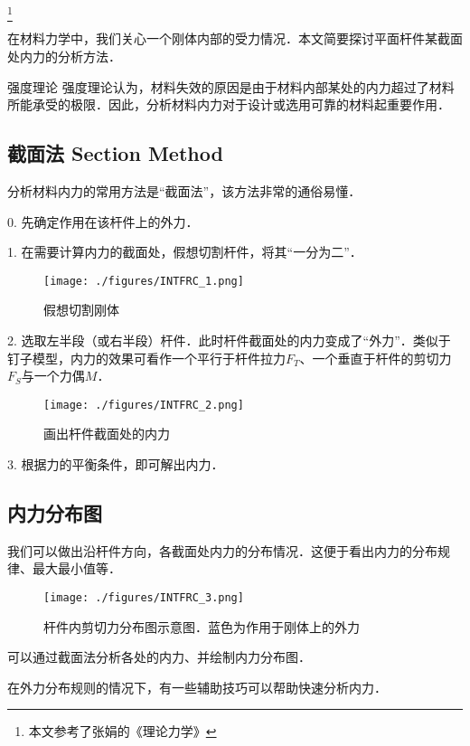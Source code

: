 
\footnote{本文参考了张娟的《理论力学》}

在材料力学中，我们关心一个刚体内部的受力情况．本文简要探讨平面杆件某截面处内力的分析方法．

\begin{example}{强度理论}
强度理论认为，材料失效的原因是由于材料内部某处的内力超过了材料所能承受的极限．因此，分析材料内力对于设计或选用可靠的材料起重要作用．
\end{example}

\subsection{截面法 Section Method}
分析材料内力的常用方法是“截面法”，该方法非常的通俗易懂．

0. 先确定作用在该杆件上的外力．

1. 在需要计算内力的截面处，假想切割杆件，将其“一分为二”．
\begin{figure}[ht]
\centering
\texttt{[image: ./figures/INTFRC\_1.png]}
\caption{假想切割刚体} \label{INTFRC_fig1}
\end{figure}

2. 选取左半段（或右半段）杆件．此时杆件截面处的内力变成了“外力”．类似于钉子模型，内力的效果可看作一个平行于杆件拉力$F_T$、一个垂直于杆件的剪切力$F_S$与一个力偶$M$．
\begin{figure}[ht]
\centering
\texttt{[image: ./figures/INTFRC\_2.png]}
\caption{画出杆件截面处的内力} \label{INTFRC_fig2}
\end{figure}

3. 根据力的平衡条件，即可解出内力．

\subsection{内力分布图}
我们可以做出沿杆件方向，各截面处内力的分布情况．这便于看出内力的分布规律、最大最小值等．
\begin{figure}[ht]
\centering
\texttt{[image: ./figures/INTFRC\_3.png]}
\caption{杆件内剪切力分布图示意图．蓝色为作用于刚体上的外力} \label{INTFRC_fig3}
\end{figure}

可以通过截面法分析各处的内力、并绘制内力分布图．

在外力分布规则的情况下，有一些辅助技巧可以帮助快速分析内力．

